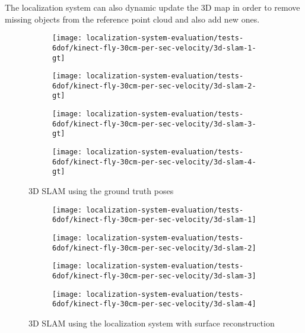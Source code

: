 The localization system can also dynamic update the 3D map in order to remove missing objects from the reference point cloud and also add new ones.


\begin{figure}[H]
	\centering
	\begin{subfigure}[ht]{0.49\textwidth}
		\centering
		\texttt{[image: localization-system-evaluation/tests-6dof/kinect-fly-30cm-per-sec-velocity/3d-slam-1-gt]}
	\end{subfigure}
	\begin{subfigure}[ht]{0.49\textwidth}
		\centering
		\texttt{[image: localization-system-evaluation/tests-6dof/kinect-fly-30cm-per-sec-velocity/3d-slam-2-gt]}
	\end{subfigure}
	\begin{subfigure}[ht]{0.49\textwidth}
		\centering
		\texttt{[image: localization-system-evaluation/tests-6dof/kinect-fly-30cm-per-sec-velocity/3d-slam-3-gt]}
	\end{subfigure}
	\begin{subfigure}[ht]{0.49\textwidth}
		\centering
		\texttt{[image: localization-system-evaluation/tests-6dof/kinect-fly-30cm-per-sec-velocity/3d-slam-4-gt]}
	\end{subfigure}
	\caption{3D SLAM using the ground truth poses}
	\label{fig:localization-system-evaluation_kinect-fly-30cm-per-sec-velocity-gt-slam}
\end{figure}


\begin{figure}[H]
	\centering
	\begin{subfigure}[ht]{0.49\textwidth}
		\centering
		\texttt{[image: localization-system-evaluation/tests-6dof/kinect-fly-30cm-per-sec-velocity/3d-slam-1]}
	\end{subfigure}
	\begin{subfigure}[ht]{0.49\textwidth}
		\centering
		\texttt{[image: localization-system-evaluation/tests-6dof/kinect-fly-30cm-per-sec-velocity/3d-slam-2]}
	\end{subfigure}
	\begin{subfigure}[ht]{0.49\textwidth}
		\centering
		\texttt{[image: localization-system-evaluation/tests-6dof/kinect-fly-30cm-per-sec-velocity/3d-slam-3]}
	\end{subfigure}
	\begin{subfigure}[ht]{0.49\textwidth}
		\centering
		\texttt{[image: localization-system-evaluation/tests-6dof/kinect-fly-30cm-per-sec-velocity/3d-slam-4]}
	\end{subfigure}
	\caption{3D SLAM using the localization system with surface reconstruction}
	\label{fig:localization-system-evaluation_kinect-fly-30cm-per-sec-velocity-drl-slam}
\end{figure}



